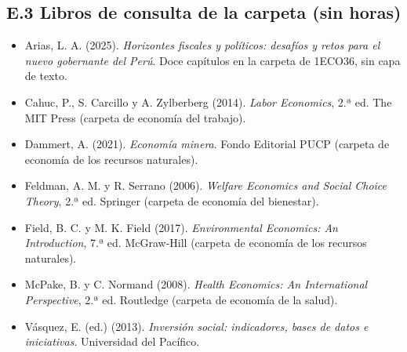 \documentclass[11pt,a4paper]{article}
\begin{document}
\subsection*{E.3 Libros de consulta de la carpeta (sin horas)}
{\small
\begin{itemize}[leftmargin=1.4em,itemsep=1pt,label={}]
\item Arias, L. A. (2025). \emph{Horizontes fiscales y políticos: desafíos y retos para el nuevo gobernante del Perú}. Doce capítulos en la carpeta de 1ECO36, sin capa de texto.
\item Cahuc, P., S. Carcillo y A. Zylberberg (2014). \emph{Labor Economics}, 2.ª ed. The MIT Press (carpeta de economía del trabajo).
\item Dammert, A. (2021). \emph{Economía minera}. Fondo Editorial PUCP (carpeta de economía de los recursos naturales).
\item Feldman, A. M. y R. Serrano (2006). \emph{Welfare Economics and Social Choice Theory}, 2.ª ed. Springer (carpeta de economía del bienestar).
\item Field, B. C. y M. K. Field (2017). \emph{Environmental Economics: An Introduction}, 7.ª ed. McGraw-Hill (carpeta de economía de los recursos naturales).
\item McPake, B. y C. Normand (2008). \emph{Health Economics: An International Perspective}, 2.ª ed. Routledge (carpeta de economía de la salud).
\item Vásquez, E. (ed.) (2013). \emph{Inversión social: indicadores, bases de datos e iniciativas}. Universidad del Pacífico.
\end{itemize}
}
\end{document}
